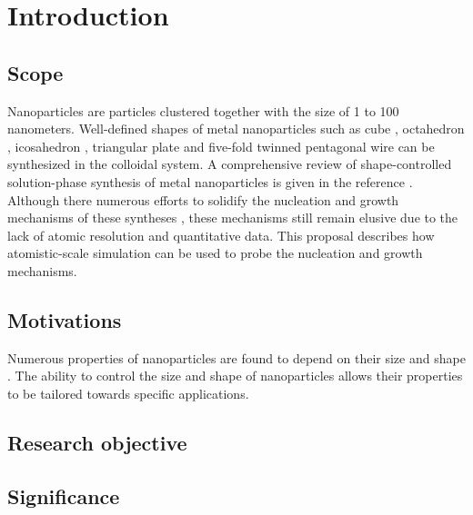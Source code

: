 \section{Introduction}

\subsection{Scope}

Nanoparticles are particles clustered together with the size of 1 to 100 nanometers. Well-defined shapes of metal nanoparticles such as cube \cite{Im_2005}, octahedron \cite{Xia_2012}, icosahedron \cite{Xiong_2007}, triangular plate \cite{Lofton_2005} and five-fold twinned pentagonal wire \cite{Tsuji_2008} can be synthesized in the colloidal system. A comprehensive review of shape-controlled solution-phase synthesis of metal nanoparticles is given in the reference \cite{Xia_2008}. Although there numerous efforts to solidify the nucleation and growth mechanisms of these syntheses \cite{Lofton_2005,Mariscal_2012,Park_2013,Viswanath_2009,Liao_2014,Chang_2011,Murph_2015}, these mechanisms still remain elusive due to the lack of atomic resolution and quantitative data. This proposal describes how atomistic-scale simulation can be used to probe the nucleation and growth mechanisms.

\subsection{Motivations}

Numerous properties of nanoparticles are found to depend on their size \cite{Roduner_2006} and shape \cite{Xia_2008}. The ability to control the size and shape of nanoparticles allows their properties to be tailored towards specific applications.

\subsection{Research objective}

\subsection{Significance}